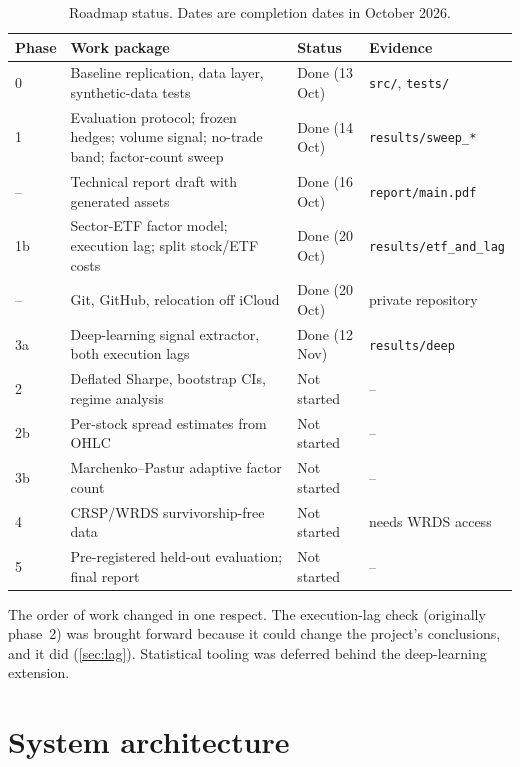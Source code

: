 \documentclass[11pt,a4paper]{article}
\newcommand{\code}[1]{\texttt{#1}}
\begin{document}
\begin{table}[ht]
\centering
\caption{Roadmap status. Dates are completion dates in October 2026.}
\label{tab:roadmap}
\small
\begin{tabular}{@{}p{}>{\raggedright\arraybackslash}p{}>{\raggedright\arraybackslash}p{}>{\raggedright\arraybackslash\footnotesize}p{}@{}}
\toprule
Phase & Work package & Status & Evidence \\
\midrule
0 & Baseline replication, data layer, synthetic-data tests & Done (13 Oct) & \code{src/}, \code{tests/} \\
1 & Evaluation protocol; frozen hedges; volume signal; no-trade band; factor-count sweep & Done (14 Oct) & \code{results/sweep\_*} \\
-- & Technical report draft with generated assets & Done (16 Oct) & \code{report/main.pdf} \\
1b & Sector-ETF factor model; execution lag; split stock/ETF costs & Done (20 Oct) & \code{results/etf\_and\_lag} \\
-- & Git, GitHub, relocation off iCloud & Done (20 Oct) & private repository \\
3a & Deep-learning signal extractor, both execution lags & Done (12 Nov) & \code{results/deep} \\
2 & Deflated Sharpe, bootstrap CIs, regime analysis & Not started & -- \\
2b & Per-stock spread estimates from OHLC & Not started & -- \\
3b & Marchenko--Pastur adaptive factor count & Not started & -- \\
4 & CRSP/WRDS survivorship-free data & Not started & needs WRDS access \\
5 & Pre-registered held-out evaluation; final report & Not started & -- \\
\bottomrule
\end{tabular}
\end{table}

The order of work changed in one respect. The execution-lag check (originally phase~2) was
brought forward because it could change the project's conclusions, and it did
(\cref{sec:lag}). Statistical tooling was deferred behind the deep-learning extension.

\section{System architecture}
\label{sec:arch}
\end{document}
